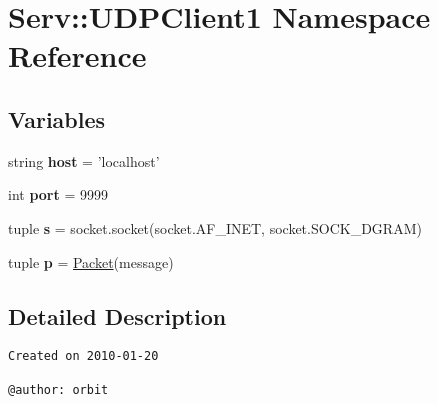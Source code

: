 \hypertarget{namespace_serv_1_1_u_d_p_client1}{
\section{Serv::UDPClient1 Namespace Reference}
\label{namespace_serv_1_1_u_d_p_client1}
}
\subsection*{Variables}
\begin{CompactItemize}
\item 
\hypertarget{namespace_serv_1_1_u_d_p_client1_1c083a48b797a20f54695f5f04a55fbd}{
string \textbf{host} = 'localhost'}
\label{namespace_serv_1_1_u_d_p_client1_1c083a48b797a20f54695f5f04a55fbd}

\item 
\hypertarget{namespace_serv_1_1_u_d_p_client1_19ea7a101002ec92988b4b88c69f56cd}{
int \textbf{port} = 9999}
\label{namespace_serv_1_1_u_d_p_client1_19ea7a101002ec92988b4b88c69f56cd}

\item 
\hypertarget{namespace_serv_1_1_u_d_p_client1_30d457e78e8df51c992f0481290cdf21}{
tuple \textbf{s} = socket.socket(socket.AF\_\-INET, socket.SOCK\_\-DGRAM)}
\label{namespace_serv_1_1_u_d_p_client1_30d457e78e8df51c992f0481290cdf21}

\item 
\hypertarget{namespace_serv_1_1_u_d_p_client1_f17cbd754c908d1407b2b97f5ed053fe}{
tuple \textbf{p} = \hyperlink{class_serv_1_1_packet_1_1_packet}{Packet}(message)}
\label{namespace_serv_1_1_u_d_p_client1_f17cbd754c908d1407b2b97f5ed053fe}

\end{CompactItemize}


\subsection{Detailed Description}


\footnotesize\begin{verbatim}
Created on 2010-01-20

@author: orbit
\end{verbatim}
\normalsize
 


